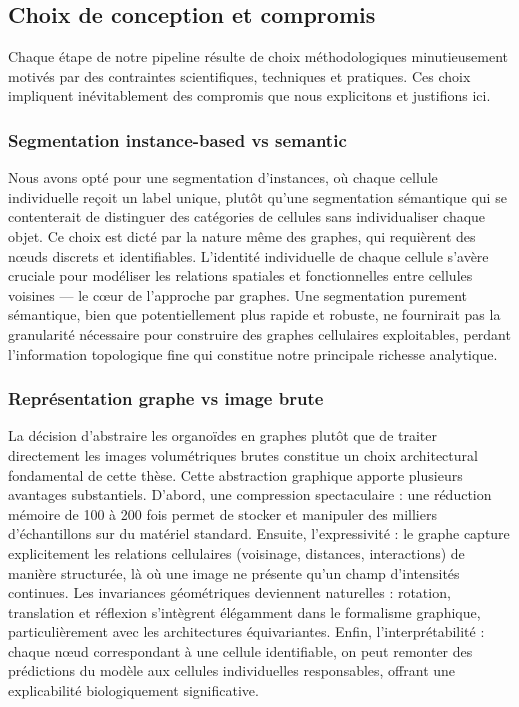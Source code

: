 \subsection{Choix de conception et compromis}

Chaque étape de notre pipeline résulte de choix méthodologiques minutieusement motivés par des contraintes scientifiques, techniques et pratiques. Ces choix impliquent inévitablement des compromis que nous explicitons et justifions ici.

\subsubsection{Segmentation instance-based vs semantic}

Nous avons opté pour une segmentation d'instances, où chaque cellule individuelle reçoit un label unique, plutôt qu'une segmentation sémantique qui se contenterait de distinguer des catégories de cellules sans individualiser chaque objet. Ce choix est dicté par la nature même des graphes, qui requièrent des nœuds discrets et identifiables. L'identité individuelle de chaque cellule s'avère cruciale pour modéliser les relations spatiales et fonctionnelles entre cellules voisines — le cœur de l'approche par graphes. Une segmentation purement sémantique, bien que potentiellement plus rapide et robuste, ne fournirait pas la granularité nécessaire pour construire des graphes cellulaires exploitables, perdant l'information topologique fine qui constitue notre principale richesse analytique.

\subsubsection{Représentation graphe vs image brute}

La décision d'abstraire les organoïdes en graphes plutôt que de traiter directement les images volumétriques brutes constitue un choix architectural fondamental de cette thèse. Cette abstraction graphique apporte plusieurs avantages substantiels. D'abord, une compression spectaculaire : une réduction mémoire de 100 à 200 fois permet de stocker et manipuler des milliers d'échantillons sur du matériel standard. Ensuite, l'expressivité : le graphe capture explicitement les relations cellulaires (voisinage, distances, interactions) de manière structurée, là où une image ne présente qu'un champ d'intensités continues. Les invariances géométriques deviennent naturelles : rotation, translation et réflexion s'intègrent élégamment dans le formalisme graphique, particulièrement avec les architectures équivariantes. Enfin, l'interprétabilité : chaque nœud correspondant à une cellule identifiable, on peut remonter des prédictions du modèle aux cellules individuelles responsables, offrant une explicabilité biologiquement significative.

